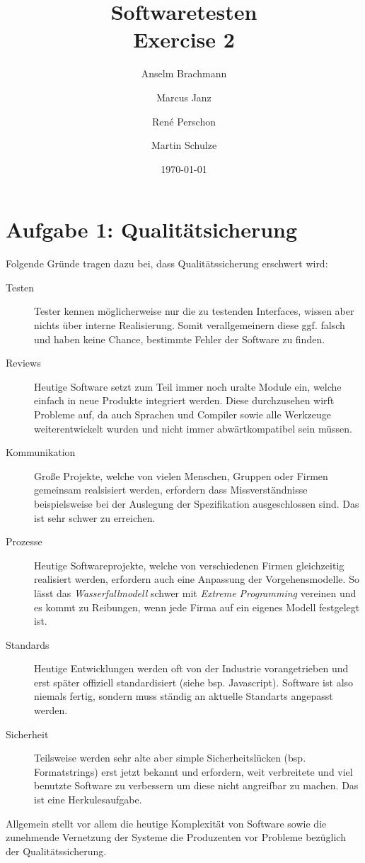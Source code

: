 \documentclass[a4paper,11pt]{article}
\title{\textbf{Softwaretesten}\\Exercise 2}
\author{Anselm Brachmann\and Marcus Janz \and René Perschon \and Martin Schulze}
\date{\today}
\begin{document}
	
\maketitle


\section*{Aufgabe 1: Qualitätsicherung}
Folgende Gründe tragen dazu bei, dass Qualitätssicherung erschwert wird:
\begin{description}

		\item[Testen] Tester kennen möglicherweise nur die zu testenden Interfaces, wissen aber nichts über interne Realisierung. Somit verallgemeinern diese ggf. falsch und haben keine Chance, bestimmte Fehler der Software zu finden.

		\item[Reviews] Heutige Software setzt zum Teil immer noch uralte Module ein, welche einfach in neue Produkte integriert werden. Diese durchzusehen wirft Probleme auf, da auch Sprachen und Compiler sowie alle Werkzeuge weiterentwickelt wurden und nicht immer abwärtkompatibel sein müssen.

		\item[Kommunikation] Große Projekte, welche von vielen Menschen, Gruppen oder Firmen gemeinsam realsisiert werden, erfordern dass Missverständnisse beispielsweise bei der Auslegung der Spezifikation ausgeschlossen sind. Das ist sehr schwer zu erreichen.

		\item[Prozesse] Heutige Softwareprojekte, welche von verschiedenen Firmen gleichzeitig realisiert werden, erfordern auch eine Anpassung der Vorgehensmodelle. So lässt das \emph{Wasserfallmodell} schwer mit \emph{Extreme Programming} vereinen und es kommt zu Reibungen, wenn jede Firma auf ein eigenes Modell festgelegt ist.

		\item[Standards] Heutige Entwicklungen werden oft von der Industrie vorangetrieben und erst später offiziell standardisiert (siehe bsp. Javascript). Software ist also niemals fertig, sondern muss ständig an aktuelle Standarts angepasst werden.

		\item[Sicherheit] Teilsweise werden sehr alte aber simple Sicherheitslücken (bsp. Formatstrings) erst jetzt bekannt und erfordern, weit verbreitete und viel benutzte Software zu verbessern um diese nicht angreifbar zu machen. Das ist eine Herkulesaufgabe.
\end{description}
Allgemein stellt vor allem die heutige Komplexität von Software sowie die zunehmende Vernetzung der Systeme die Produzenten vor Probleme bezüglich der Qualitätssicherung.
\end{document}
